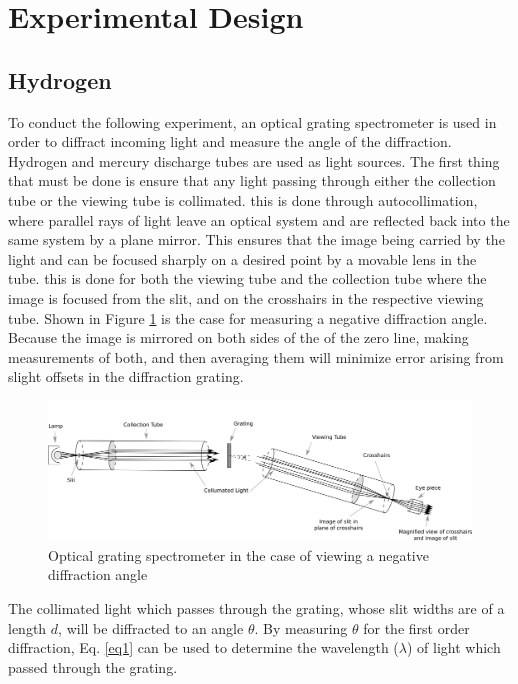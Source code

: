 \documentclass[prb,preprint]{revtex4-1}
\begin{document}
\newpage
\section{Experimental Design}
\subsection{Hydrogen}
To conduct the following experiment, an optical grating spectrometer is used in order to diffract incoming light and measure the angle of the diffraction. Hydrogen and mercury discharge tubes are used as light sources. The first thing that must be done is ensure that any light passing through either the collection tube or the viewing tube is collimated. this is done through autocollimation, where parallel rays of light leave an optical system and are reflected back into the same system by a plane mirror. This ensures that the image being carried by the light and can be focused sharply on a desired point by a movable lens in the tube. this is done for both the viewing tube and the collection tube where the image is focused from the slit, and on the crosshairs in the respective viewing tube. Shown in Figure \ref{ExpFig} is the case for measuring a negative diffraction angle. Because the image is mirrored on both sides of the of the zero line, making measurements of both, and then averaging them will minimize error arising from slight offsets in the diffraction grating.

\begin{figure}[h]
\centering
\includegraphics[width=\textwidth]{Lab2Fig.png}
\caption{Optical grating spectrometer in the case of viewing a negative diffraction angle}
\label{ExpFig}
\end{figure}

The collimated light which passes through the grating, whose slit widths are of a length $d$, will be diffracted to an angle $\theta$. By measuring $\theta$ for the first order diffraction, Eq. \eqref{eq1} can be used to determine the wavelength ($\lambda$) of light which passed through the grating.
\end{document}
